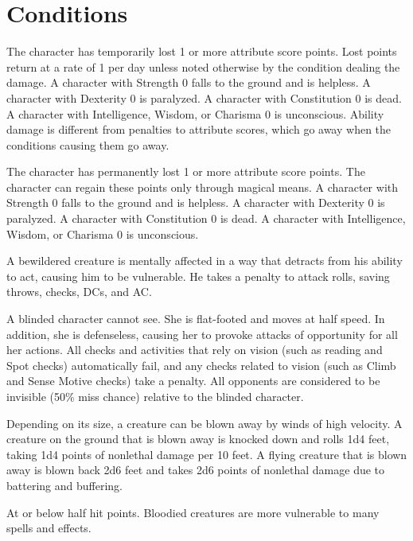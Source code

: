 \appendix
\chapter{Conditions}

 The character has temporarily lost 1 or more attribute score points. Lost points return at a rate of 1 per day unless noted otherwise by the condition dealing the damage. A character with Strength 0 falls to the ground and is helpless. A character with Dexterity 0 is paralyzed. A character with Constitution 0 is dead. A character with Intelligence, Wisdom, or Charisma 0 is unconscious. Ability damage is different from penalties to attribute scores, which go away when the conditions causing them go away.

 The character has permanently lost 1 or more attribute score points. The character can regain these points only through magical means. A character with Strength 0 falls to the ground and is helpless. A character with Dexterity 0 is paralyzed. A character with Constitution 0 is dead. A character with Intelligence, Wisdom, or Charisma 0 is unconscious.

 A bewildered creature is mentally affected in a way that detracts from his ability to act, causing him to be vulnerable. He takes a  penalty to attack rolls, saving throws, checks, DCs, and AC.

 A blinded character cannot see. She is flat-footed and moves at half speed. In addition, she is defenseless, causing her to provoke attacks of opportunity for all her actions. All checks and activities that rely on vision (such as reading and Spot checks) automatically fail, and any checks related to vision (such as Climb and Sense Motive checks) take a  penalty. All opponents are considered to be invisible (50\% miss chance) relative to the blinded character.

 Depending on its size, a creature can be blown away by winds of high velocity. A creature on the ground that is blown away is knocked down and rolls 1d4  feet, taking 1d4 points of nonlethal damage per 10 feet. A flying creature that is blown away is blown back 2d6  feet and takes 2d6 points of nonlethal damage due to battering and buffering.

 At or below half hit points. Bloodied creatures are more vulnerable to many spells and effects.

